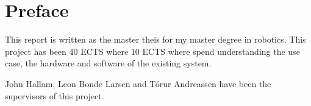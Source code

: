 {\let\clearpage\relax\chapter*{Preface}}
This report is written as the master theis for my master degree in robotics. This project has been 40 ECTS where 10 ECTS where spend understanding the use case, the hardware and software of the existing system.

John Hallam, Leon Bonde Larsen and Tórur Andreassen have been the supervisors of this project.

